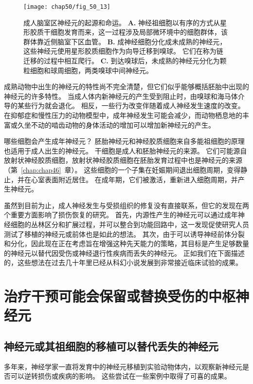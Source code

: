 \begin{figure}[htbp]
	\centering
	\texttt{[image: chap50/fig\_50\_13]}
	\caption{成人脑室区神经元的起源和命运\cite{tavazoie2008specialized}。
		\textbf{A.} 神经祖细胞以有序的方式从星形胶质干细胞发育而来，这一过程涉及局部微环境中的细胞群体，该群体靠近侧脑室下区血管。
		\textbf{B.} 成神经细胞分化成未成熟的神经元，这些神经元使用星形胶质细胞作为向导迁移到嗅球。
		它们在称为链迁移的过程中相互爬行。
		\textbf{C.} 到达嗅球后，未成熟的神经元分化为颗粒细胞和球周细胞，两类嗅球中间神经元。}
	\label{fig:50_13}
\end{figure}


成熟动物中出生的神经元的特性尚不完全清楚，但它们似乎能够概括胚胎中出现的神经元的许多特性。
当成人体内新神经元的产生受到阻止时，由嗅球和海马体介导的某些行为就会退化。
相反，一些行为改变伴随着成人神经发生速度的改变。
在抑郁症和慢性压力的动物模型中，成年神经发生可能会减少，而动物栖息地的丰富或久坐不动的啮齿动物的身体活动的增加可以增加新神经元的产生。


哪些细胞会产生成年神经元？
胚胎神经元和神经胶质细胞来自多能祖细胞的原理也适用于成人出生的神经元。
干细胞是成人和胚胎神经元的来源。
它们可能源自放射状神经胶质细胞，放射状神经胶质细胞在胚胎发育过程中也是神经元的来源（第~\ref{chap:chap46}~章）。
这些细胞的一个子集在妊娠期间退出细胞周期，变得静止，并在心室表面附近居住。
在成年期，它们被激活，重新进入细胞周期，并产生神经元。


虽然到目前为止，成人神经发生与受损组织的修复没有直接联系，但它的发现在两个重要方面影响了损伤恢复的研究。
首先，内源性产生的神经元可以通过成年神经细胞的丛林区分和扩展过程，并可以整合到功能回路中，这一发现促使研究人员测试了移植的神经元或前体也是如此的想法。
其次，由于可以诱导神经前体分裂和分化，因此现在正在考虑旨在增强这种先天能力的策略，其目标是产生足够数量的神经元以替代因受伤或神经退行性疾病而丢失的神经元。
正如我们在下面描述的，这些想法在过去几十年里已经从科幻小说发展到非常接近临床试验的成果。



\section{治疗干预可能会保留或替换受伤的中枢神经元}

\subsection{神经元或其祖细胞的移植可以替代丢失的神经元}

多年来，神经学家一直将发育中的神经元移植到实验动物体内，以观察新神经元是否可以逆转损伤或疾病的影响。
这些尝试在一些案例中取得了可喜的成果。


